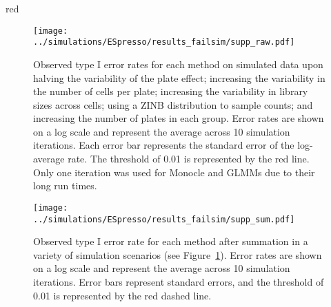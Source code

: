 \documentclass{article}
\begin{document}
\begin{color}{red}
\begin{figure}[p]
    \begin{center}
        \texttt{[image: ../simulations/ESpresso/results\_failsim/supp\_raw.pdf]}
    \end{center}
    \caption{    
        Observed type I error rates for each method on simulated data upon halving the variability of the plate effect; increasing the variability in the number of cells per plate; increasing the variability in library sizes across cells; using a ZINB distribution to sample counts; and increasing the number of plates in each group.
        Error rates are shown on a log scale and represent the average across 10 simulation iterations.
        Each error bar represents the standard error of the log-average rate.
        The threshold of 0.01 is represented by the red line.
        Only one iteration was used for Monocle and GLMMs due to their long run times.
    }
    \label{fig:extrafail}
\end{figure}

\begin{figure}[p]
    \begin{center}
        \texttt{[image: ../simulations/ESpresso/results\_failsim/supp\_sum.pdf]}
    \end{center}
    \caption{   
        Observed type I error rate for each method after summation in a variety of simulation scenarios (see Figure~\ref{fig:extrafail}).
        Error rates are shown on a log scale and represent the average across 10 simulation iterations.
        Error bars represent standard errors, and the threshold of 0.01 is represented by the red dashed line.
    }
\end{figure}


\end{color}
\end{document}
